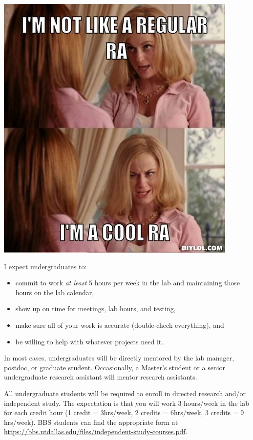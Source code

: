 \documentclass[
]{book}
\providecommand{\tightlist}{%
  \setlength{\itemsep}{0pt}\setlength{\parskip}{0pt}}
\begin{document}
\includegraphics{images/RAmeme.jpg}

I expect undergraduates to:

\begin{itemize}
\tightlist
\item
  commit to work \emph{at least} 5 hours per week in the lab and maintaining those hours on the lab calendar,
\item
  show up on time for meetings, lab hours, and testing,\\
\item
  make sure all of your work is accurate (double-check everything), and
\item
  be willing to help with whatever projects need it.
\end{itemize}

In most cases, undergraduates will be directly mentored by the lab manager, postdoc, or graduate student. Occasionally, a Master's student or a senior undergraduate research assistant will mentor research assistants.

All undergraduate students will be required to enroll in directed research and/or independent study. The expectation is that you will work 3 hours/week in the lab for each credit hour (1 credit = 3hrs/week, 2 credits = 6hrs/week, 3 credits = 9 hrs/week). BBS students can find the appropriate form at \url{https://bbs.utdallas.edu/files/independent-study-courses.pdf}.
\end{document}
